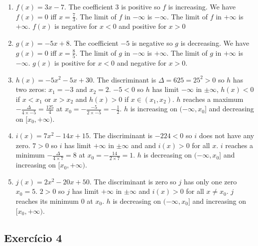 \begin{enumerate}
\item $f(x) = 3x - 7$. The coefficient $3$ is positive so $f$ is increasing.
  We have $f(x) = 0$ iff $x = \frac{7}{3}$.
  The limit of $f$ in $-\infty$ is $-\infty$. The limit of $f$ in $+\infty$
  is $+\infty$.  $f(x)$ is negative for $x < 0$ and positive for $x > 0$
\item $g(x) = -5x + 8$. The coefficient $-5$ is negative so $g$ is decreasing.
  We have $g(x) = 0$ iff $x = \frac{8}{5}$. The limit of $g$ in $-\infty$
  is $+\infty$.  The limit of $g$ in $+\infty$ is $-\infty$. $g(x)$ is positive
  for $x < 0$ and negative for $x > 0$.
\item $h(x) = -5x^2 - 5x + 30$.
  The discriminant is $\Delta = 625 = 25^2 > 0$ so $h$ has
  two zeros: $x_1 = -3$ and $x_2 = 2$. $-5 < 0$ so $h$ has limit $-\infty$
  in $\pm\infty$, $h(x) < 0$ if $x < x_1$ or $x > x_2$ and
  $h(x) > 0$ if $x \in (x_1,x_2)$.
  $h$ reaches a maximum $-\frac{\Delta}{4 \times -5} = \frac{125}{4}$ at
  $x_0 = -\frac{-5}{2 \times -5} = -\frac{1}{2}$. $h$ is increasing on
  $(-\infty, x_0]$  and decreasing on $[x_0, +\infty)$.
  
\item $i(x) = 7x^2 - 14x + 15$.
  The discriminant is $-224 < 0$ so $i$ does not have any zero.
  $7 > 0$ so $i$ has limit $+\infty$ in $\pm\infty$ and
  and $i(x) > 0$ for all $x$. $i$ reaches a minimum
  $-\frac{\Delta}{4 \times 7} = 8$ at
  $x_0 = -\frac{14}{2 \times 7} = 1$. $h$ is decreasing on
  $(-\infty, x_0]$  and increasing on $[x_0, +\infty)$.
  
\item $j(x) = 2x^2 -20x+50$. The discriminant is zero so $j$ has only one
  zero $x_0 = 5$. $2 > 0$ so $j$ has limit $+\infty$ in $\pm\infty$ and
  $i(x) > 0$ for all $x \neq x_0$. $j$ reaches its minimum $0$ at $x_0$.
  $h$ is decreasing on
  $(-\infty, x_0]$  and increasing on $[x_0, +\infty)$.
      
\end{enumerate}

\subsection*{Exercício 4}

